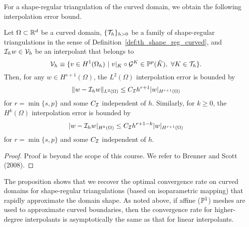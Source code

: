 For a shape-regular triangulation of the curved domain, we obtain the following interpolation error bound.
\begin{proposition}
  \label{prop:th_interp_gen_iso}
  Let $\Omega \subset \mathbb{R}^d$ be a curved domain, $\{\mathcal{T}_h\}_{h > 0}$ be a family of shape-regular triangulations in the sense of Definition~\ref{def:th_shape_reg_curved}, and $\mathcal{I}_h w \in \mathcal{V}_h$ be an interpolant that belongs to
  \begin{equation*}
    \calV_h \equiv \{ v \in H^1(\Omega_h) \ | \ v|_K \circ \calG^K \in \PP^p(\tilde K), \ \forall K \in \calT_h \}.
  \end{equation*}
  Then, for any $w \in H^{s+1}(\Omega)$,  the $L^2(\Omega)$ interpolation error is bounded by
\begin{align*}
  \| w - \mathcal{I}_h w \|_{L^2(\Omega)} \leq C_{\mathcal{I}} h^{r+1} | w |_{H^{r+1}(\Omega)}
\end{align*}
for $r = \min\{ s,p \}$ and some $C_{\mathcal{I}}$ independent of $h$. Similarly, for $k \geq 0$, the $H^k(\Omega)$ interpolation error is bounded by
\begin{align*}
  | w - \mathcal{I}_h w |_{H^k(\Omega)} \leq C_{\mathcal{I}} h^{r+1-k} | w |_{H^{r+1}(\Omega)}
\end{align*}
for $r = \min\{ s,p \}$ and some $C_{\mathcal{I}}$ independent of $h$.
\begin{proof}
  Proof is beyond the scope of this course. We refer to Brenner and Scott (2008).
\end{proof}
\end{proposition}
The proposition shows that we recover the optimal convergence rate on curved domains for shape-regular triangulations (based on isoparametric mapping) that rapidly approximate the domain shape.  As noted above, if affine ($\mathbb{P}^1$) meshes are used to approximate curved boundaries, then the convergence rate for higher-degree interpolants is asymptotically the same as that for linear interpolants.


